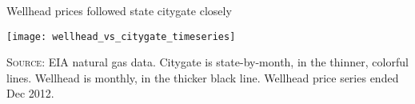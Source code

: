 \caption{Wellhead prices followed state citygate closely}
\label{fig:wellhead-vs-citygate-timeseries}
\texttt{[image: wellhead\_vs\_citygate\_timeseries]}

\textsc{Source:} EIA natural gas data.
Citygate is state-by-month, in the thinner, colorful lines.
Wellhead is monthly, in the thicker black line.
Wellhead price series ended Dec 2012.
